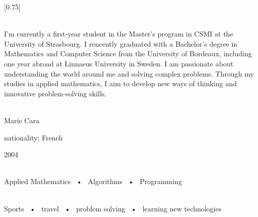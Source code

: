 \documentclass[lighthipster]{simplehipstercv}
\begin{document}
\setlength{\columnsep}{1.5cm}
[0.75]
\begin{paracol}{2}

\paracolbackgroundoptions



\footnotesize
{\setasidefontcolour
\flushright
\begin{center}
\end{center}

\begin{center}
\\[0.5em]

{\footnotesize
    I'm currently a first-year student in the Master's program in CSMI at the University of Strasbourg.
    I rencently graduated with a Bachelor's degree in Mathematics and Computer Science from the University of Bordeaux, including one year abroad at Linnaeus University in Sweden.
    I am passionate about understanding the world around me and solving complex problems. Through my studies in applied mathematics, I aim to develop new ways of thinking and innovative problem-solving skills.
 }

\bigskip

 \\[0.5em]
Marie Cara

nationality: French 

2004

\bigskip

 \\[0.5em]

Applied Mathematics ~•~ Algorithms ~•~ Programming

\bigskip



\bigskip

\\[0.5em]
Sports ~•~ travel ~•~ problem solving ~•~ learning new technologies

\end{center}
\bigskip

\vspace{4em}


}
\end{paracol}
\end{document}

